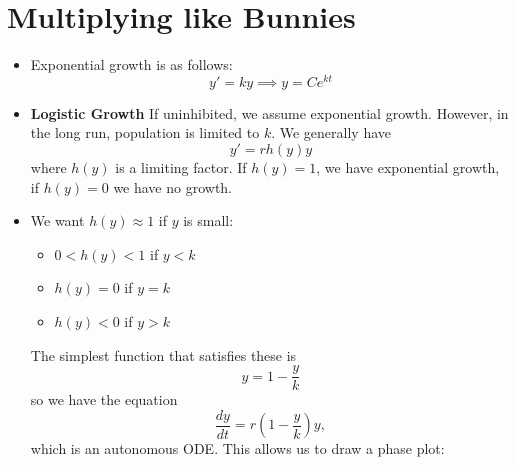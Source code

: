 \section{Multiplying like Bunnies}
\begin{itemize}
    \item Exponential growth is as follows: 
    \begin{equation}
        y' = ky \implies y = Ce^{kt}
    \end{equation}
    \item \textbf{Logistic Growth} If uninhibited, we assume exponential growth. However, in the long run, population is limited to $k$. We generally have 
    \begin{equation}
        y' = rh(y)y
    \end{equation}
    where $h(y)$ is a limiting factor. If $h(y)=1$, we have exponential growth, if $h(y)=0$ we have no growth.
    \item We want $h(y)\approx 1$ if $y$ is small: 
    \begin{itemize}
        \item $0<h(y)<1$ if $y<k$
        \item $h(y) = 0$ if $y=k$
        \item $h(y) < 0$ if $y > k$
    \end{itemize}
    The simplest function that satisfies these is
    \begin{equation}
        y = 1 - \frac{y}{k}
    \end{equation}
    so we have the equation 
    \begin{equation}
        \frac{dy}{dt} = r\left(1-\frac{y}{k}\right)y,
    \end{equation}
    which is an autonomous ODE. This allows us to draw a phase plot:
    \begin{center}
    \end{center}

\end{itemize}
